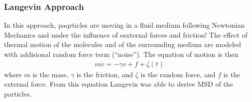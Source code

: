 \subsubsection{Langevin Approach}

In this approach, paqrticles are moving in a fluid medium following
Newtonian Mechanics and under the influence of esxternal forces and
friction! The effect of thermal motion of the molecules and of the
surrounding medium are modeled with addisional random force term
(``noise''). The equation of motion is then
%
\begin{align}
  m\dot v = - \gamma v + f + \zeta (t) \label{eq-langevin}
\end{align}
%
where $m$ is the mass, $\gamma$ is the friction, and $\zeta$ is the
random force, and $f$ is the external force. From this equation
Langevin was able to derive MSD of the particles.



